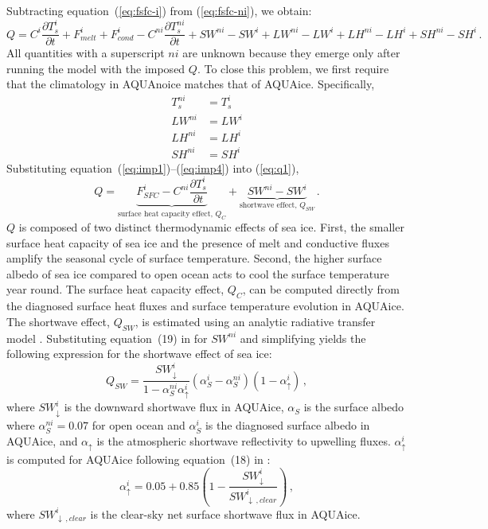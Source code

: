 \documentclass[draft]{agujournal2019}
\begin{document}
Subtracting equation~(\ref{eq:fsfc-i}) from (\ref{eq:fsfc-ni}), we obtain:
\begin{equation}\label{eq:q1}
    Q =  C^i\frac{\partial T^{i}_{s}}{\partial t} + F^i_{melt} + F^i_{cond} - C^{ni}\frac{\partial T^{ni}_{s}}{\partial t} + SW^{ni} - SW^{i} + LW^{ni} - LW^{i} + LH^{ni} - LH^{i} + SH^{ni} - SH^{i} \, .
\end{equation}
All quantities with a superscript $ni$ are unknown because they emerge only after running the model with the imposed $Q$. To close this problem, we first require that the climatology in AQUAnoice matches that of AQUAice. Specifically,
\begin{align}
    T^{ni}_s &= T^i_s \label{eq:imp1}\\
    LW^{ni} &= LW^i \label{eq:imp2}\\
    LH^{ni} &= LH^i \label{eq:imp3}\\
    SH^{ni} &= SH^i \label{eq:imp4}
\end{align}
Substituting equation~(\ref{eq:imp1})--(\ref{eq:imp4}) into (\ref{eq:q1}),
\begin{equation}\label{eq:q2}
    Q =  \underbrace{F^i_{SFC} - C^{ni}\frac{\partial T^{i}_{s}}{\partial t}}_{\text{surface heat capacity effect, }Q_C} + \underbrace{SW^{ni} - SW^{i}}_{\text{shortwave effect, }Q_{SW}} \, .
\end{equation}
$Q$ is composed of two distinct thermodynamic effects of sea ice. First, the smaller surface heat capacity of sea ice and the presence of melt and conductive fluxes amplify the seasonal cycle of surface temperature. Second, the higher surface albedo of sea ice compared to open ocean acts to cool the surface temperature year round. The surface heat capacity effect, $Q_C$, can be computed directly from the diagnosed surface heat fluxes and surface temperature evolution in AQUAice. The shortwave effect, $Q_{SW}$, is estimated using an analytic radiative transfer model \cite{winton2005}. Substituting equation~(19) in  for $SW^{ni}$ and simplifying yields the following expression for the shortwave effect of sea ice:
\begin{equation} \label{eq:qs3}
    Q_{SW}=\frac{SW^{i}_{\downarrow}}{1-\alpha^{ni}_S\alpha^i_\uparrow}(\alpha^i_S-\alpha^{ni}_S)(1-\alpha^i_\uparrow)\,,
\end{equation}
where $SW^i_\downarrow$ is the downward shortwave flux in AQUAice, $\alpha_S$ is the surface albedo where $\alpha^{ni}_S=0.07$ for open ocean and $\alpha^{i}_S$ is the diagnosed surface albedo in AQUAice, and $\alpha_{\uparrow}$ is the atmospheric shortwave reflectivity to upwelling fluxes. $\alpha^i_{\uparrow}$ is computed for AQUAice following equation~(18) in :
\begin{equation}
    \alpha^i_\uparrow=0.05+0.85\left(1-\frac{SW^i_\downarrow}{SW^i_{\downarrow\,,clear}}\right)\,,
\end{equation}
where $SW^i_{\downarrow\,,clear}$ is the clear-sky net surface shortwave flux in AQUAice.
\end{document}
